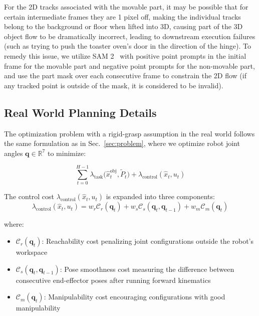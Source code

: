 For the 2D tracks associated with the movable part, it may be possible that for certain intermediate frames they are 1 pixel off, making the individual tracks belong to the background or floor when lifted into 3D, causing part of the 3D object flow to be dramatically incorrect, leading to downstream execution failures (such as trying to push the toaster oven's door in the direction of the hinge). To remedy this issue, we utilize SAM 2~\cite{ravi2024sam2} with positive point prompts in the initial frame for the movable part and negative point prompts for the non-movable part, and use the part mask over each consecutive frame to constrain the 2D flow (if any tracked point is outside of the mask, it is considered to be invalid). 

\subsection{Real World Planning Details}
\label{sec:real_world_planning}

The optimization problem with a rigid-grasp assumption in the real world follows the same formulation as in Sec.~\ref{sec:problem}, where we optimize robot joint angles $\mathbf{q} \in \mathbb{R}^7$ to minimize:

\begin{equation}
\sum_{t=0}^{H-1} \lambda_{\text{task}}\big(\hat{x}^{\text{obj}}_t, \tilde{P}_t\big) + \lambda_{\text{control}}(\hat{x}_t, u_t)
\end{equation}

The control cost $\lambda_{\text{control}}(\hat{x}_t, u_t)$ is expanded into three components:
\begin{equation}
\lambda_{\text{control}}(\hat{x}_t, u_t) = w_r \mathcal{C}_r(\mathbf{q}_t) + w_s \mathcal{C}_s(\mathbf{q}_t, \mathbf{q}_{t-1}) + w_m \mathcal{C}_m(\mathbf{q}_t)
\end{equation}

where:
\begin{itemize}
\item $\mathcal{C}_r(\mathbf{q}_t)$: Reachability cost penalizing joint configurations outside the robot's workspace
\item $\mathcal{C}_s(\mathbf{q}_t, \mathbf{q}_{t-1})$: Pose smoothness cost measuring the difference between consecutive end-effector poses after running forward kinematics
\item $\mathcal{C}_m(\mathbf{q}_t)$: Manipulability cost encouraging configurations with good manipulability
\end{itemize}

